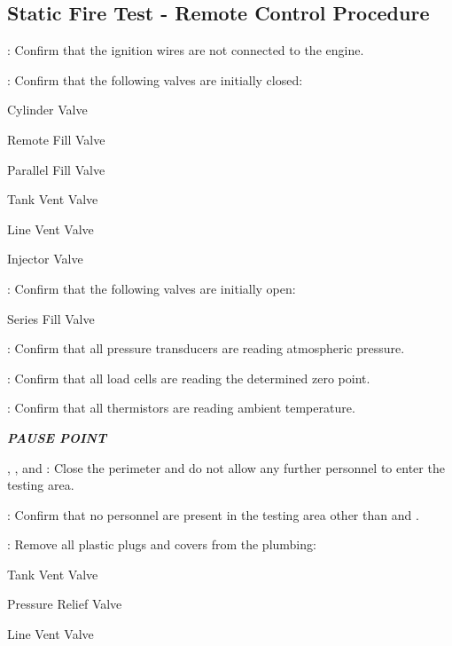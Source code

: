 \subsection{Static Fire Test - Remote Control Procedure}
\begin{checklist}
    \item \secondary{}: Confirm that the ignition wires are not connected to the engine.
    \item \primary{}: Confirm that the following valves are initially closed:
    \begin{checklist}
        \item Cylinder Valve
        \item Remote Fill Valve
        \item Parallel Fill Valve
        \item Tank Vent Valve
        \item Line Vent Valve
        \item Injector Valve
    \end{checklist}
    \item \primary{}: Confirm that the following valves are initially open:
    \begin{checklist}
        \item Series Fill Valve
    \end{checklist}
    \item \daq{}: Confirm that all pressure transducers are reading atmospheric pressure.
    \item \daq{}: Confirm that all load cells are reading the determined zero point.
    \item \daq{}: Confirm that all thermistors are reading ambient temperature.
    \item \textbf{\textit{PAUSE POINT}}
    \item \peri{}, \perii{}, and \periii{}: Close the perimeter and do not allow any further personnel to enter the testing area.
    \item \secondary{}: Confirm that no personnel are present in the testing area other than \primary{} and \secondary{}.
    \item \primary{}: Remove all plastic plugs and covers from the plumbing:
    \begin {checklist}
        \item Tank Vent Valve
        \item Pressure Relief Valve
        \item Line Vent Valve

\end{checklist}
\end{checklist}
